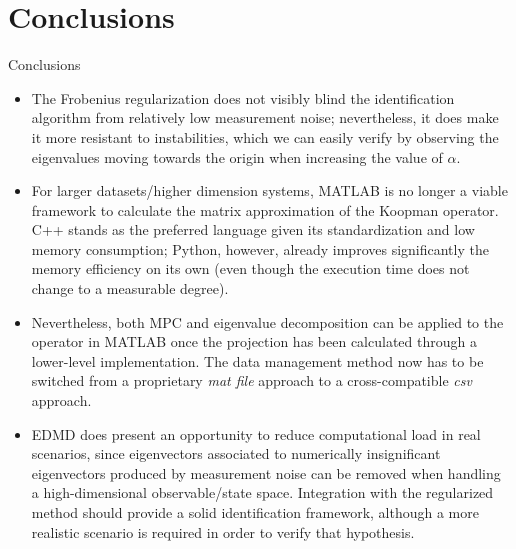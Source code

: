 \documentclass{beamer}
\begin{document}
\section{Conclusions}

\begin{frame}[allowframebreaks]{Conclusions}
    \begin{itemize}
        \item The Frobenius regularization does not visibly blind the identification algorithm from relatively low measurement noise; nevertheless, it does make it more resistant to instabilities, which we can easily verify by observing the eigenvalues moving towards the origin when increasing the value of $\alpha$.
        \item For larger datasets/higher dimension systems, MATLAB is no longer a viable framework to calculate the matrix approximation of the Koopman operator. C++ stands as the preferred language given its standardization and low memory consumption; Python, however, already improves significantly the memory efficiency on its own (even though the execution time does not change to a measurable degree).
        \item Nevertheless, both MPC and eigenvalue decomposition can be applied to the operator in MATLAB once the projection has been calculated through a lower-level implementation. The data management method now has to be switched from a proprietary \textit{mat file} approach to a cross-compatible \textit{csv} approach.
        \item EDMD does present an opportunity to reduce computational load in real scenarios, since eigenvectors associated to numerically insignificant eigenvectors produced by measurement noise can be removed when handling a high-dimensional observable/state space. Integration with the regularized method should provide a solid identification framework, although a more realistic scenario is required in order to verify that hypothesis.
    \end{itemize}
\end{frame}
\end{document}
